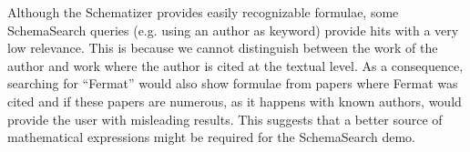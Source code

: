 \documentclass[a4paper,oneside]{article}
\begin{document}
Although the Schematizer provides easily recognizable formulae, some
\textsf{SchemaSearch} queries (e.g. using an author as keyword) provide hits
with a very low relevance. This is because we cannot distinguish between the
work of the author and work where the author is cited at the textual level. As
a consequence, searching for ``Fermat'' would also show formulae from papers
where Fermat was cited and if these papers are numerous, as it happens with
known authors, would provide the user with misleading results. This suggests
that a better source of mathematical expressions might be required for the
SchemaSearch demo.

\printbibliography
\end{document}
